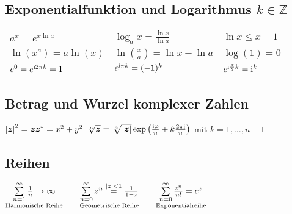 \documentclass[german,color,5pt]{latex4ei/latex4ei_fs}
\begin{document}
\begin{sectionbox}
	\subsection{Exponentialfunktion und Logarithmus $k\in\mathbb{Z}$}
	\begin{tabular}{lll}
		$a^x = e^{x \ln a}$ & $\log_a x = \frac{\ln x}{\ln a}$ & $\ln x \le x -1$\\
		$\ln(x^{a}) = a \ln(x)$ & $\ln(\frac{x}{a}) = \ln x - \ln a$ & $\log(1) = 0$\\
		$e^0=e^{\mathrm{i}2\pi k}=1$ & $e^{\mathrm{i}\pi k} =(-1)^k$ &  $e^{\mathrm{i} \frac{\pi}{2} k} =\mathrm{i}^k$ 
	\end{tabular}
\end{sectionbox}

\begin{sectionbox}
	\subsection{Betrag und Wurzel komplexer Zahlen}
	$\left\vert\boldsymbol{z}\right\vert^2 = \boldsymbol{z} \boldsymbol z^* = x^2+y^2$ \qquad $\sqrt[n]{\boldsymbol{z}}=\sqrt[n]{|\boldsymbol{z}|} \exp \left( \frac{\mathrm{i} \varphi}{n} + k\frac{2\pi\mathrm{i}}{n}\right)$ mit $k=1,\dots,n-1$
\end{sectionbox}

\begin{sectionbox}
	\subsection{Reihen}
	$\underset{\text{Harmonische Reihe}}{\sum\limits_{n=1}^\infty \frac{1}{n} \rightarrow \infty} \qquad   \underset{\text{Geometrische Reihe}}{\sum\limits_{n=0}^\infty z^n \stackrel{|z|<1}= \frac{1}{1-z}}  \qquad \underset{\text{Exponentialreihe}}{\sum\limits_{n = 0}^{\infty} \frac{z^n}{n!} = e^z}$
\end{sectionbox}

%	
	
\end{document}
